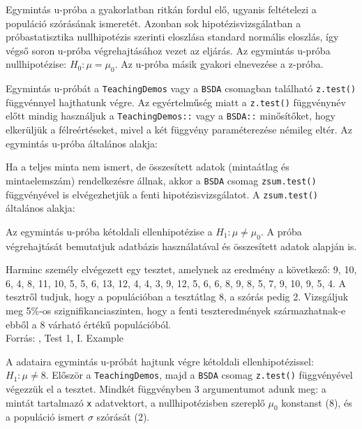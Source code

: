 \documentclass[
]{book}
\begin{document}
Egymintás u-próba a gyakorlatban ritkán fordul elő, ugyanis feltételezi a populáció szórásának ismeretét. Azonban sok hipotézisvizsgálatban a próbastatisztika nullhipotézis szerinti eloszlása standard normális eloszlás, így végső soron u-próba végrehajtásához vezet az eljárás. Az egymintás u-próba nullhipotézise: \(H_0:\mu=\mu_0\). Az u-próba másik gyakori elnevezése a z-próba.

Egymintás u-próbát a \texttt{TeachingDemos} vagy a \texttt{BSDA} csomagban található \texttt{z.test()} függvénnyel hajthatunk végre. Az egyértelműség miatt a \texttt{z.test()} függvénynév előtt mindig használjuk a \texttt{TeachingDemos::} vagy a \texttt{BSDA::} minősítőket, hogy elkerüljük a félreértéseket, mivel a két függvény paraméterezése némileg eltér. Az egymintás u-próba általános alakja:

Ha a teljes minta nem ismert, de összesített adatok (mintaátlag és mintaelemszám) rendelkezésre állnak, akkor a \texttt{BSDA} csomag \texttt{zsum.test()} függvényével is elvégezhetjük a fenti hipotézisvizsgálatot. A \texttt{zsum.test()} általános alakja:

Az egymintás u-próba kétoldali ellenhipotézise a \(H_1:\mu \neq \mu_0\). A próba végrehajtását bemutatjuk adatbázis használatával és összesített adatok alapján is.

Harminc személy elvégezett egy tesztet, amelynek az eredmény a következő: 9, 10, 6, 4, 8, 11, 10, 5, 5, 6, 13, 12, 4, 4, 3, 9, 12, 5, 6, 6, 8, 9, 8, 5, 7, 9, 10, 9, 5, 4. A tesztről tudjuk, hogy a populációban a tesztátlag 8, a szórás pedig 2. Vizsgáljuk meg 5\%-os szignifikanciaszinten, hogy a fenti teszteredmények származhatnak-e ebből a 8 várható értékű populációból.\\
Forrás: \citet{Healy}, Test 1, I. Example

A adataira egymintás u-próbát hajtunk végre kétoldali ellenhipotézissel: \(H_1:\mu \neq 8\). Először a \texttt{TeachingDemos}, majd a \texttt{BSDA} csomag \texttt{z.test()} függvényével végezzük el a tesztet. Mindkét függvényben 3 argumentumot adunk meg: a mintát tartalmazó \texttt{x} adatvektort, a nullhipotézisben szereplő \(\mu_0\) konstanst (8), és a populáció ismert \(\sigma\) szórását (2).
\end{document}
